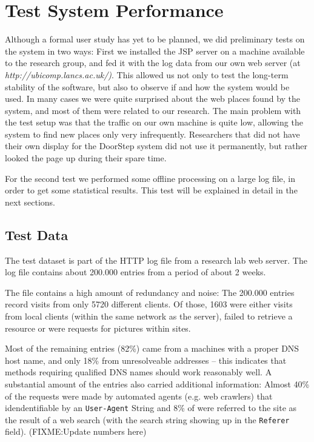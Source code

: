 \documentclass[a4paper]{danarticle}
\theoremstyle{remark}
\begin{document}
  \section{Test System Performance} 
    Although a formal user study has yet to be planned, we did 
    preliminary tests on the system in two ways: First we installed the JSP 
    server on a machine available to the research group, and fed it with the 
    log data from our own web server (at 
    \textit{http://ubicomp.lancs.ac.uk/)}. This allowed us not only to test 
    the long-term stability of the software, but also to observe if and how 
    the system would be used. In many cases we were quite surprised about 
    the web places found by the system, and most of them were related to our 
    research. The main problem with the test setup was that the traffic on 
    our own machine is quite low, allowing the system to find new places 
    only very infrequently. Researchers that did not have their own display 
    for the DoorStep system did not use it permanently, but rather looked 
    the page up during their spare time.
    
    For the second test we performed some offline processing on a large log 
    file, in order to get some statistical results. This test will be explained 
    in detail in the next sections.
    \subsection{Test Data}
      The test dataset is part of the HTTP log file from a research lab
      web server. The log file contains about 200.000 entries from a period of
      about 2 weeks.
      
      The file contains a high amount of redundancy and noise: The 200.000 
      entries record visits from only 5720 different clients. Of those, 1603 
      were either visits from local clients (within the same network as the 
      server), failed to retrieve a resource or were requests for pictures 
      within sites.
      
      Most of the remaining entries (82\%) came from a machines with a proper
      DNS host name, and only 18\% from unresolveable addresses -- this indicates
      that methods requiring qualified DNS names should work reasonably well. A
      substantial amount of the entries also carried additional information:
      Almost 40\% of the requests were made by automated agents (e.g. web
      crawlers) that idendentifiable by an \verb$User-Agent$ String and 8\% of
      were referred to the site as the result of a web search (with the search
      string showing up in the \verb$Referer$ field). (FIXME:Update numbers 
      here)
\end{document}
